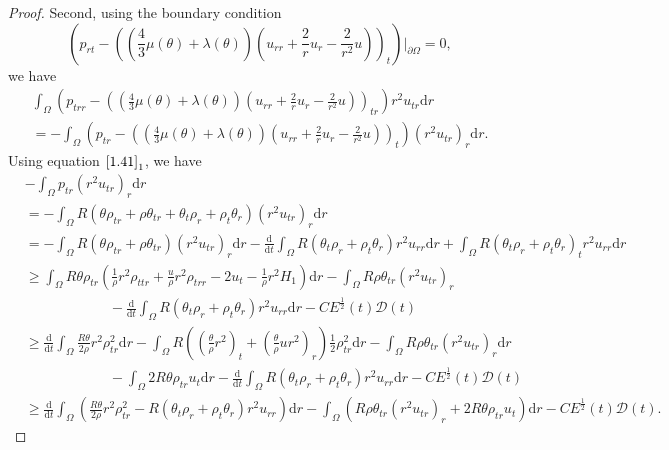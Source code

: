 \documentclass[10pt,a4paper]{amsart}
\newcommand{\dif}{\mathrm{d}}
\begin{document}
\begin{proof}
 Second, using the boundary condition
 $$
 \left(p_{rt}-\left(\left(\frac{4}{3} \mu(\theta)+\lambda(\theta)\right)\left(u_{rr}+\frac{2}{r}u_r-\frac{2}{r^2} u\right)\right)_{t}\right)|_{\partial \Omega}=0,
 $$
 we have
 \begin{align*}
 \int_{\Omega} \left(p_{trr} -\left(\left(\frac{4}{3} \mu(\theta)+\lambda(\theta)\right)\left(u_{rr}+\frac{2}{r}u_r-\frac{2}{r^2} u\right)\right)_{tr}\right) r^2 u_{tr}\dif r  \\
 =-\int_{\Omega} \left(p_{tr} -\left(\left(\frac{4}{3} \mu(\theta)+\lambda(\theta)\right)\left(u_{rr}+\frac{2}{r}u_r-\frac{2}{r^2} u\right)\right)_{t}\right) (r^2 u_{tr})_r \dif r .
 \end{align*}
Using equation $\eqref{1.41}_1$, we have{\small
 \begin{align*}
 &-\int_{\Omega} p_{tr} (r^2 u_{tr})_r\dif r \\
 &=-\int_{\Omega} R\left( \theta \rho_{tr}+\rho \theta_{tr}+\theta_t \rho_r+\rho_t \theta_r\right) (r^2 u_{tr})_r \dif r\\
 &=-\int_{\Omega} R(\theta \rho_{tr}+\rho \theta_{tr}) (r^2 u_{tr})_r\dif r -\frac{\dif}{\dif t} \int_{\Omega} R(\theta_t \rho_r+\rho_t\theta_r)r^2u_{rr} \dif r+\int_{\Omega} R(\theta_t \rho_r+\rho_t\theta_r)_t r^2 u_{rr} \dif r\\
& \ge \int_{\Omega} R \theta \rho_{tr} \left(\frac{1}{\rho} r^2 \rho_{ttr}+\frac{u}{\rho} r^2 \rho_{trr}-2 u_t-\frac{1}{\rho} r^2 H_1\right) \dif r-\int_{\Omega} R\rho \theta_{tr} (r^2 u_{tr})_r  \\
&\qquad\qquad\qquad-\frac{\dif}{\dif t} \int_{\Omega} R(\theta_t \rho_r+\rho_t\theta_r)r^2u_{rr} \dif r- C E^\frac{1}{2}(t) \mathcal D(t)\\
& \ge \frac{\dif}{\dif t} \int_{\Omega} \frac{R\theta}{2\rho} r^2  \rho_{tr}^2 \dif r -\int_{\Omega} R\left( \left(\frac{\theta}{\rho} r^2\right)_t+\left( \frac{\theta}{\rho} u r^2 \right)_r \right) \frac{1}{2} \rho_{tr}^2 \dif r
 -\int_{\Omega} R\rho \theta_{tr} (r^2 u_{tr})_r \dif r \\
 &\qquad\qquad\qquad -\int_{\Omega} 2 R\theta \rho_{tr} u_t \dif r -\frac{\dif}{\dif t} \int_{\Omega} R(\theta_t \rho_r+\rho_t\theta_r)r^2u_{rr} \dif r - C E^\frac{1}{2}(t) \mathcal D(t)\\
& \ge  \frac{\dif}{\dif t} \int_{\Omega} \left(\frac{R\theta}{2\rho} r^2  \rho_{tr}^2  -R(\theta_t \rho_r+\rho_t\theta_r)r^2u_{rr}\right) \dif r   -\int_{\Omega} (R\rho \theta_{tr} (r^2 u_{tr})_r + 2 R\theta \rho_{tr} u_t )\dif r -  C E^\frac{1}{2}(t) \mathcal D(t).
 \end{align*}}

\end{proof}
\end{document}

